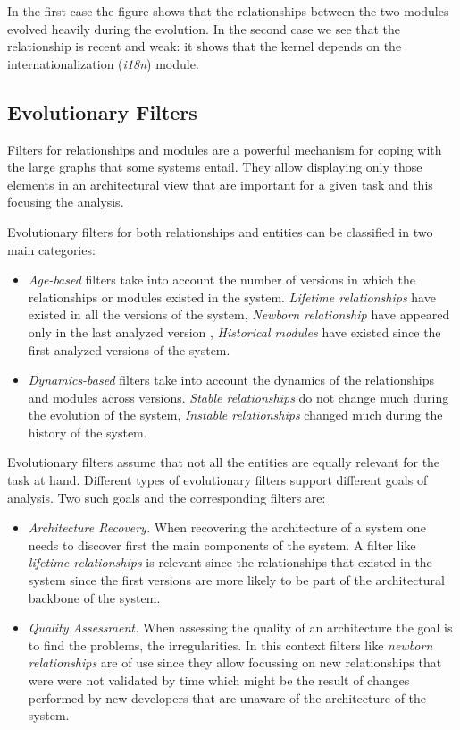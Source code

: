 \documentclass[preprint,12pt]{elsarticle}
\begin{document}
In the first case the figure shows that the relationships between the two modules evolved heavily during the evolution. In the second case we see that the relationship is recent and weak: it shows that the kernel depends on the internationalization ({\em i18n}) module. 



\subsection {Evolutionary Filters}

Filters for relationships and modules are a powerful mechanism for coping with the large graphs that some systems entail. They allow displaying only those elements in an architectural view that are important for a given task and this focusing the analysis. 

Evolutionary filters for both relationships and entities can be classified in two main categories:

\begin{itemize}
\item {\em Age-based} filters take into account the number of versions in which the relationships or modules existed in the system. {\em Lifetime relationships} have existed in all the versions of the system, {\em Newborn relationship} have appeared only in the last analyzed version \cite{lungu-relevo}, {\em Historical modules} have existed since the first analyzed versions of the system.
\item {\em Dynamics-based} filters take into account the dynamics of the relationships and modules across versions. {\em Stable relationships} do not change much during the evolution of the system, {\em Instable relationships} changed much during the history of the system.
\end{itemize}

Evolutionary filters assume that not all the entities are equally relevant for the task at hand. Different types of evolutionary filters support different goals of analysis. Two such goals and the corresponding filters are:

\begin{itemize}
\item {\em Architecture Recovery.} When recovering the architecture of a system one needs to discover first the main components of the system. A filter like {\em lifetime relationships} is relevant since the relationships that existed in the system since the first versions are more likely to be part of the architectural backbone of the system.
\item {\em Quality Assessment.} When assessing the quality of an architecture the goal is to find the problems, the irregularities. In this context filters like {\em newborn relationships} are of use since they allow focussing on new relationships that were were not validated by time which might be the result of changes performed by new developers that are unaware of the architecture of the system. 
\end{itemize}
\end{document}

